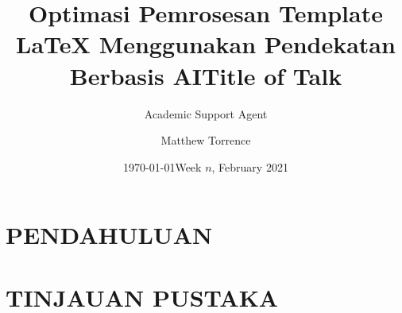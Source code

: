 \documentclass{beamer}
\title{Optimasi Pemrosesan Template LaTeX Menggunakan Pendekatan Berbasis AI}
\author{Academic Support Agent}
\date{\today}
\begin{document}
\maketitle

\begin{abstract}

\end{abstract}

\chapter{PENDAHULUAN}


\chapter{TINJAUAN PUSTAKA}


\usepackage[T1]{fontenc}


{}

\sectionnamestrue

\sectionslidestrue

\title{Title of Talk}
\author[M. Torrence]{Matthew Torrence}
\date[2021]{Week $n$, February 2021}
\end{document}
